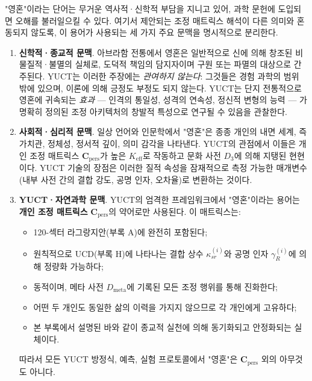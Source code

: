 \documentclass[12pt,a4paper]{article}
\begin{document}
	"영혼"이라는 단어는 무거운 역사적·신학적 부담을 지니고 있어, 과학 문헌에 도입되면 오해를 불러일으킬 수 있다. 여기서 제안되는 조정 매트릭스 해석이 다른 의미와 혼동되지 않도록, 이 용어가 사용되는 세 가지 주요 문맥을 명시적으로 분리한다.
	
	\begin{enumerate}[leftmargin=*]
		\item \textbf{신학적·종교적 문맥}.
		아브라함 전통에서 영혼은 일반적으로 신에 의해 창조된 비물질적·불멸의 실체로, 도덕적 책임의 담지자이며 구원 또는 파멸의 대상으로 간주된다. YUCT는 이러한 주장에는 \emph{관여하지 않는다}: 그것들은 경험 과학의 범위 밖에 있으며, 이론에 의해 긍정도 부정도 되지 않는다. YUCT는 단지 전통적으로 영혼에 귀속되는 \emph{효과} — 인격의 통일성, 성격의 연속성, 정신적 변형의 능력 — 가 명확히 정의된 조정 아키텍처의 창발적 특성으로 연구될 수 있음을 관찰한다.
		
		\item \textbf{사회적·심리적 문맥}.
		일상 언어와 인문학에서 "영혼"은 종종 개인의 내면 세계, 즉 가치관, 정체성, 정서적 깊이, 의미 감각을 나타낸다. YUCT의 관점에서 이들은 개인 조정 매트릭스 \(\mathbf{C}_{\text{pers}}\)가 높은 \(K_{\mathrm{eff}}\)로 작동하고 문화 사전 \(D_3\)에 의해 지탱된 현현이다. YUCT 기술의 장점은 이러한 질적 속성을 잠재적으로 측정 가능한 매개변수(내부 사전 간의 결합 강도, 공명 인자, 오차율)로 변환하는 것이다.
		
		\item \textbf{YUCT·자연과학 문맥}.
		YUCT의 엄격한 프레임워크에서 "영혼"이라는 용어는 \textbf{개인 조정 매트릭스} \(\mathbf{C}_{\text{pers}}\)의 약어로만 사용된다. 이 매트릭스는:
		\begin{itemize}
			\item 120-섹터 라그랑지안(부록 A)에 완전히 포함된다;
			\item 원칙적으로 UCD(부록 H)에 나타나는 결합 상수 \(\kappa_{sr}^{(i)}\)와 공명 인자 \(\gamma_R^{(i)}\)에 의해 정량화 가능하다;
			\item 동적이며, 메타 사전 \(D_{\text{meta}}\)에 기록된 모든 조정 행위를 통해 진화한다;
			\item 어떤 두 개인도 동일한 삶의 이력을 가지지 않으므로 각 개인에게 고유하다;
			\item 본 부록에서 설명된 바와 같이 종교적 실천에 의해 동기화되고 안정화되는 실체이다.
		\end{itemize}
		따라서 모든 YUCT 방정식, 예측, 실험 프로토콜에서 "영혼"은 \(\mathbf{C}_{\text{pers}}\) 외의 아무것도 아니다.
	\end{enumerate}
	
\end{document}
